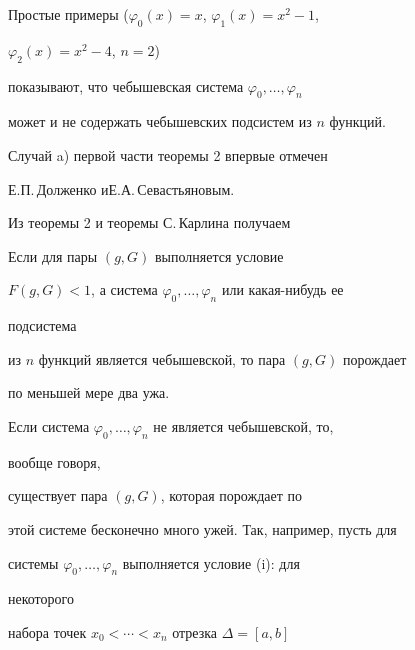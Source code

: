  


\begin{note} Простые примеры ($\varphi_0(x)=x$, $\varphi_1(x)=x^2-1$, 


$\varphi_2(x)=x^2-4$, $n=2$) 


показывают, что чебышевская система $\varphi_0,\dotsc,\varphi_n$ 


может и не содержать чебышевских подсистем из $n$ функций. 


\end{note} 


 


\begin{note} Случай a) первой части теоремы 2 впервые отмечен 


Е.П.\,Долженко и\linebreak Е.А.\,Севастьяновым. 


\end{note} 


 


Из теоремы 2 и теоремы С.\,Карлина получаем 


 


\begin{cor} Если для пары $(g,G)$ выполняется условие


$F(g,G)<1$, а система $\varphi_0,\dotsc,\varphi_n$ или какая-нибудь ее 


подсистема 


из $n$ функций является чебышевской, то пара $(g,G)$ порождает 


по меньшей мере два ужа. 


\end{cor} 


 


Если система $\varphi_0,\dotsc,\varphi_n$ не является чебышевской, то, 


вообще говоря,  


существует пара $(g,G)$, которая порождает по 


этой системе бесконечно много ужей. Так, например, пусть для 


системы $\varphi_0,\dotsc,\varphi_n$ выполняется условие (i): для 


некоторого 


набора точек $x_0<\dotsb<x_n$ отрезка $\Delta=[a,b]$ 


$$ 


